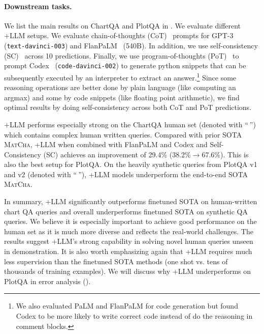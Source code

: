 \paragraph{Downstream tasks.} We list the main results on ChartQA \citep{masry-etal-2022-chartqa} and PlotQA \citep{methani2020plotqa}
in .
We evaluate different \model+LLM setups. We evaluate chain-of-thoughts (CoT)~\citep{wei2022cot} prompts for GPT-3~\cite{brown2020language} (\texttt{text-davinci-003}) and FlanPaLM~\cite{chung2022scaling} (540B). In addition, we use self-consistency (SC)~\cite{wang2022selfconsistency} across 10 predictions. Finally, we use program-of-thoughts (PoT)~\cite{chen2022program} to prompt Codex~\cite{chen2021codex} (\texttt{code-davinci-002}) to generate python snippets that can be subsequently executed by an interpreter to extract an answer.\footnote{We also evaluated PaLM and FlanPaLM for code generation but found Codex to be more likely to write correct code instead of do the reasoning in comment blocks.} Since some reasoning operations are better done by plain language (like computing an argmax) and some by code snippets (like floating point arithmetic), we find optimal results by doing self-consistency across both CoT and PoT predictions.

\model+LLM performs especially strong on the ChartQA human set (denoted with ``\colorbox{red!30}{$\ $}'') which contains complex human written queries. Compared with prior SOTA \textsc{MatCha}, \model+LLM when combined with FlanPaLM and Codex and Self-Consistency (SC) achieves an improvement of 29.4\% (38.2\%$\rightarrow$67.6\%). This is also the best setup for PlotQA. On the heavily synthetic queries from PlotQA v1 and v2 (denoted with ``\colorbox{blue!30}{$\ $}''), \model+LLM models underperform the end-to-end SOTA \textsc{MatCha}.





In summary, \model+LLM significantly outperforms finetuned SOTA on human-written chart QA queries and overall underperforms finetuned SOTA on synthetic QA queries.
We believe it is especially important to achieve good performance on the human set as it is much more diverse and reflects the real-world challenges. The results suggest \model+LLM's strong capability in solving novel human queries unseen in demonstration.
It is also worth emphasizing again that \model+LLM requires much less supervision than the finetuned SOTA methods (one shot vs. tens of thousands of training examples). We will discuss why \model+LLM underperforms on PlotQA in error analysis (). 

